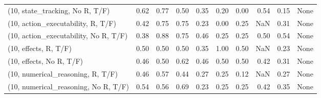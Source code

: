 \begin{table*}[h!]
\begin{adjustbox}{width=2\columnwidth,center}
\begin{tabular}{lrrr|rrr|rrr}
(10, state\_tracking, No R, T/F)       &                      0.62 &                  0.77 &                      0.50 &                          0.35 &                      0.20 &                          0.00 &                                   0.54 &                               0.15 &                                  None \\
(10, action\_executability, R, T/F)    &                      0.42 &                  0.75 &                      0.75 &                          0.23 &                      0.00 &                          0.25 &                                    NaN &                               0.31 &                                  None \\
(10, action\_executability, No R, T/F) &                      0.38 &                  0.88 &                      0.75 &                          0.46 &                      0.25 &                          0.25 &                                   0.50 &                               0.54 &                                  None \\
(10, effects, R, T/F)                 &                      0.50 &                  0.50 &                      0.50 &                          0.35 &                      1.00 &                          0.50 &                                    NaN &                               0.23 &                                  None \\
(10, effects, No R, T/F)              &                      0.46 &                  0.50 &                      0.62 &                          0.46 &                      0.50 &                          0.50 &                                   0.42 &                               0.31 &                                  None \\
(10, numerical\_reasoning, R, T/F)     &                      0.46 &                  0.57 &                      0.44 &                          0.27 &                      0.25 &                          0.12 &                                    NaN &                               0.27 &                                  None \\
(10, numerical\_reasoning, No R, T/F)  &                      0.54 &                  0.56 &                      0.69 &                          0.23 &                      0.25 &                          0.25 &                                   0.42 &                               0.35 &                                  None \\

\end{tabular}
\end{adjustbox}
\end{table*}
